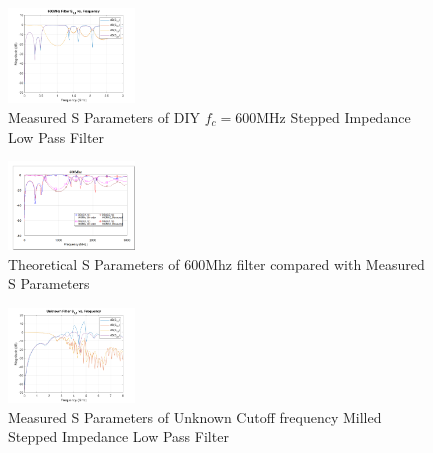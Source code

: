 \documentclass[journal]{IEEEtran}
\begin{document}
\begin{figure}
    \centering
    \includegraphics[width=0.3\textwidth]{600MHz_rl.png}
    \caption{Measured S Parameters of DIY \(f_c=600\)MHz Stepped Impedance Low Pass Filter}
\end{figure}

\begin{figure}
    \centering
    \includegraphics[width=0.3\textwidth]{AWR_600.png}
    \caption{Theoretical S Parameters of 600Mhz filter compared with Measured S Parameters}
\end{figure}

\begin{figure}
    \centering
    \includegraphics[width=0.3\textwidth]{unkown_rl.png}
    \caption{Measured S Parameters of Unknown Cutoff frequency Milled Stepped Impedance Low Pass Filter}
\end{figure}
\end{document}
